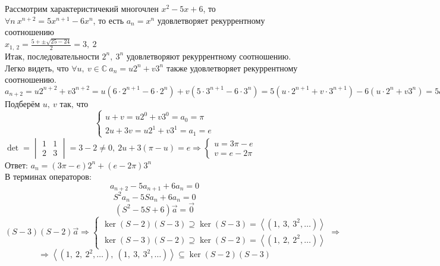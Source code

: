\documentclass[12pt, letterpaper, twoside]{article}
\begin{document}
Рассмотрим характеристичекий многочлен $x^2 - 5x + 6$, то $\forall n\ x^{n + 2} = 5x^{n + 1} - 6x^n$, то есть $a_n = x^n$ удовлетворяет рекуррентному соотношению\\
$x_{1,\ 2} = \frac{5 +\pm \sqrt{25 - 24}}{2} = 3,\ 2$\\
Итак, последовательности $2^n,\ 3^n$ удовлетворяют рекуррентному соотношению.\\
Легко видеть, что $\forall u,\ v\in\mathbb{C}\ a_n = u2^n + v3^n$ также удовлетворяет рекуррентному соотношению.\\
$a_{n + 2} = u2^{n + 2} + v3^{n + 2} = u(6\cdot 2^{n + 1} - 6\cdot 2^n) + v(5\cdot 3^{n + 1} - 6\cdot 3^n) = 5(u\cdot 2^{n + 1} + v\cdot 3^{n + 1}) - 6(u\cdot 2^n + v3^n) = 5 a_{n + 1} - 6a_n$\\
Подберём $u,\ v$ так, что
\[\begin{cases}
    u + v = u2^0 + v3^0 = a_0 = \pi\\
    2u + 3v = u2^1 + v3^1 = a_1 = e
\end{cases}\]
$\det = \begin{vmatrix}
    1 & 1\\
    2 & 3
\end{vmatrix} = 3 - 2 \neq 0,\ 2u + 3(\pi - u) = e\Rightarrow \begin{cases}
    u = 3\pi - e\\
    v = e - 2\pi
\end{cases}$\\
Ответ: $a_n = (3\pi - e)2^n + (e - 2\pi)3^n$\\
В терминах операторов:
\[a_{n + 2} - 5 a_{n + 1} + 6 a_n = 0\]
\[S^2 a_n - 5 S a_n + 6 a_n = 0\]
\[(S^2 - 5S + 6)\vec{a} = \vec{0}\]
\[(S - 3)(S - 2)\vec{a}\Rightarrow \begin{cases}
    \ker (S - 2)(S - 3)\supseteq \ker (S - 3) = \left< (1,\ 3,\ 3^2,\dots) \right>\\
    \ker (S - 3)(S - 2) \supseteq \ker (S - 2) = \left< (1,\ 2,\ 2^2,\dots) \right>
\end{cases}\Rightarrow\]
\[\Rightarrow \left< (1,\ 2,\ 2^2,\dots),\ (1,\ 3,\ 3^2,\dots) \right>\subseteq \ker (S - 2)(S - 3)\]
\end{document}
